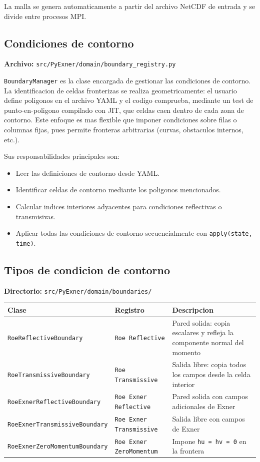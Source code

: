 \documentclass[11pt,a4paper]{article}
\newcommand{\code}[1]{\texttt{#1}}
\begin{document}
La malla se genera automaticamente a partir del archivo NetCDF de entrada y se divide entre procesos MPI.

\subsection{Condiciones de contorno}

\textbf{Archivo:} \code{src/PyExner/domain/boundary\_registry.py}

\code{BoundaryManager} es la clase encargada de gestionar las condiciones de contorno. La
identificacion de celdas fronterizas se realiza geometricamente: el usuario define poligonos
en el archivo YAML y el codigo comprueba, mediante un test de punto-en-poligono compilado
con JIT, que celdas caen dentro de cada zona de contorno. Este enfoque es mas flexible que
imponer condiciones sobre filas o columnas fijas, pues permite fronteras arbitrarias (curvas,
obstaculos internos, etc.).

Sus responsabilidades principales son:

\begin{itemize}[leftmargin=1.6em]
  \item Leer las definiciones de contorno desde YAML.
  \item Identificar celdas de contorno mediante los poligonos mencionados.
  \item Calcular indices interiores adyacentes para condiciones reflectivas o transmisivas.
  \item Aplicar todas las condiciones de contorno secuencialmente con \code{apply(state, time)}.
\end{itemize}

\subsection{Tipos de condicion de contorno}

\textbf{Directorio:} \code{src/PyExner/domain/boundaries/}

{\footnotesize
\begin{longtable}{L{5cm}L{4.5cm}L{5.2cm}}
\toprule
Clase & Registro & Descripcion \\
\midrule
\endhead
\code{RoeReflectiveBoundary} & \code{Roe Reflective} & Pared solida: copia escalares y refleja la componente normal del momento \\
\code{RoeTransmissiveBoundary} & \code{Roe Transmissive} & Salida libre: copia todos los campos desde la celda interior \\
\code{RoeExnerReflectiveBoundary} & \code{Roe Exner Reflective} & Pared solida con campos adicionales de Exner \\
\code{RoeExnerTransmissiveBoundary} & \code{Roe Exner Transmissive} & Salida libre con campos de Exner \\
\code{RoeExnerZeroMomentumBoundary} & \code{Roe Exner ZeroMomentum} & Impone \code{hu = hv = 0} en la frontera \\
\bottomrule
\end{longtable}
}
\end{document}
